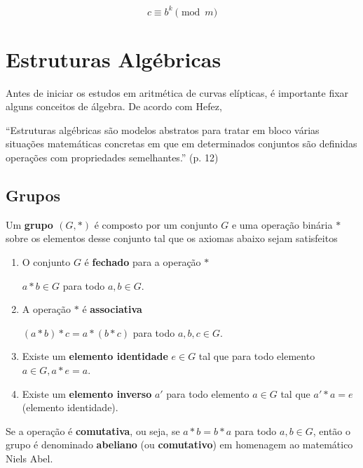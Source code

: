\begin{equation}
  c \equiv b^k\pmod m \label{eq:4}
\end{equation}

%
%
\section{Estruturas Algébricas}

Antes de iniciar os estudos em aritmética de curvas elípticas, é importante
fixar alguns conceitos de álgebra. De acordo com Hefez,

\begin{citacao}
``Estruturas algébricas são modelos abstratos para tratar em bloco várias situações matemáticas concretas em que em determinados conjuntos são definidas operações com propriedades semelhantes.'' \cite{Hefez:2008} (p. 12)
\end{citacao}

%
%
\subsection{Grupos}

Um \textbf{grupo \((G,*)\)} é composto por um conjunto \(G\) e uma operação binária \(*\) sobre os elementos desse conjunto tal que os axiomas abaixo sejam satisfeitos \cite{Gilbert:2004}

\begin{enumerate}
\item O conjunto \(G\) é \textbf{fechado} para a operação \(*\)

$a * b \in G$ para todo $a,b \in G$.

\item A operação $*$ é \textbf{associativa}

$(a * b) * c = a * (b * c)$ para todo $a,b,c \in G$.

\item Existe um \textbf{elemento identidade} $e \in G$ tal que para todo elemento $a \in G, a * e = a$.
\item Existe um \textbf{elemento inverso} \(a'\) para todo elemento $a \in G$ tal que $a' * a = e$ (elemento identidade).
\end{enumerate}

Se a operação é \textbf{comutativa}, ou seja, se $a * b = b * a$ para todo $a, b \in G$, então o grupo é denominado \textbf{abeliano} (ou \textbf{comutativo}) em homenagem ao matemático Niels Abel. \cite{Gilbert:2004}

